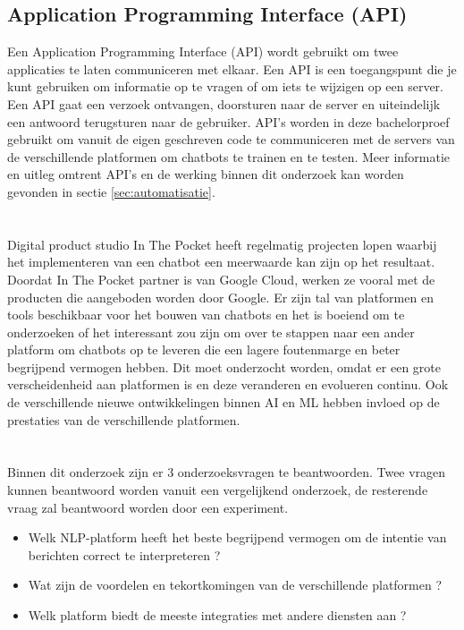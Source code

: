 \subsection{Application Programming Interface (API)}
\label{subsec:begrippen-api}

Een Application Programming Interface (API) wordt gebruikt om twee applicaties te laten communiceren met elkaar. Een API is een toegangspunt die je kunt gebruiken om informatie op te vragen of om iets te wijzigen op een server. Een API gaat een verzoek ontvangen, doorsturen naar de server en uiteindelijk een antwoord terugsturen naar de gebruiker. API’s worden in deze bachelorproef gebruikt om vanuit de eigen geschreven code te communiceren met de servers van de verschillende platformen om chatbots te trainen en te testen. Meer informatie en uitleg omtrent API’s en de werking binnen dit onderzoek kan worden gevonden in sectie \ref{sec:automatisatie}.


\newpage
\section{}
\label{sec:probleemstelling}

Digital product studio In The Pocket heeft regelmatig projecten lopen waarbij het implementeren van een chatbot een meerwaarde kan zijn op het resultaat. Doordat In The Pocket partner is van Google Cloud, werken ze vooral met de producten die aangeboden worden door Google. Er zijn tal van platformen en tools beschikbaar voor het bouwen van chatbots en het is boeiend om te onderzoeken of het interessant zou zijn om over te stappen naar een ander platform om chatbots op te leveren die een lagere foutenmarge en beter begrijpend vermogen hebben. Dit moet onderzocht worden, omdat er een grote verscheidenheid aan platformen is en deze veranderen en evolueren continu. Ook de verschillende nieuwe ontwikkelingen binnen AI en ML hebben invloed op de prestaties van de verschillende platformen.

\section{}
\label{sec:onderzoeksvraag}

Binnen dit onderzoek zijn er 3 onderzoeksvragen te beantwoorden. Twee vragen kunnen beantwoord worden vanuit een vergelijkend onderzoek, de resterende vraag zal beantwoord worden door een experiment.
\begin{itemize}
    \item Welk NLP-platform heeft het beste begrijpend vermogen om de intentie van berichten correct te interpreteren ?
    \item Wat zijn de voordelen en tekortkomingen van de verschillende platformen ?
    \item Welk platform biedt de meeste integraties met andere diensten aan ?
\end{itemize}

